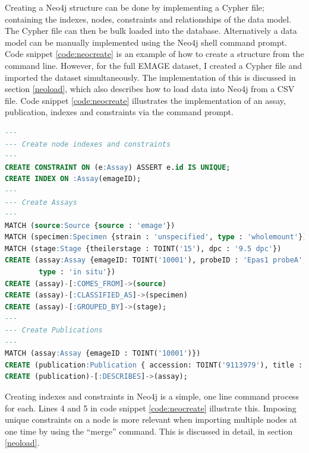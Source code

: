 Creating a Neo4j structure can be done by implementing a Cypher file; containing the indexes, nodes, constraints and relationships of the data model. The Cypher file can then be bulk loaded into the database. Alternatively a data model can be manually implemented using the Neo4j shell command prompt. Code snippet \ref{code:neocreate} is an example of how to create a structure from the command line. However, for the full EMAGE dataset, I created a Cypher file and imported the dataset simultaneously. The implementation of this is discussed in section \ref{neoload}, which also describes how to load data into Neo4j from a CSV file. Code snippet \ref{code:neocreate} illustrates the implementation of an assay, publication, indexes and constraints via the command prompt.
\newpage
\vspace*{\fill}
\begin{lstlisting}[language=SQL, caption=Example creation of an assay\, publication\, indexes and constraints in Neo4j., label=code:neocreate]
---
--- Create node indexes and constraints
---
CREATE CONSTRAINT ON (e:Assay) ASSERT e.id IS UNIQUE;
CREATE INDEX ON :Assay(emageID);
---
--- Create Assays
---
MATCH (source:Source {source : 'emage'})
MATCH (specimen:Specimen {strain : 'unspecified', type : 'wholemount'})
MATCH (stage:Stage {theilerstage : TOINT('15'), dpc : '9.5 dpc'})
CREATE (assay:Assay {emageID: TOINT('10001'), probeID : 'Epas1 probeA',
		type : 'in situ'})
CREATE (assay)-[:COMES_FROM]->(source)
CREATE (assay)-[:CLASSIFIED_AS]->(specimen)
CREATE (assay)-[:GROUPED_BY]->(stage);
---
--- Create Publications
---
MATCH (assay:Assay {emageID : TOINT('10001')})
CREATE (publication:Publication { accession: TOINT('9113979'), title : 'A novel bHLH-PAS factor with close sequence similarity to hypoxia-inducible factor 1alpha regulates the VEGF expression and is potentially involved in lung and vascular development.', author : 'Ema M, Taya S, Yokotani N, Sogawa K, Matsuda Y, Fujii-Kuriyama Y'})
CREATE (publication)-[:DESCRIBES]->(assay);
\end{lstlisting}
\vspace*{\fill}
\newpage

Creating indexes and constraints in Neo4j is a simple, one line command process for each. Lines 4 and 5 in code snippet \ref{code:neocreate} illustrate this. Imposing unique constraints on a node is more relevant when importing multiple nodes at one time by using the ``merge'' command. This is discussed in detail, in section \ref{neoload}.

